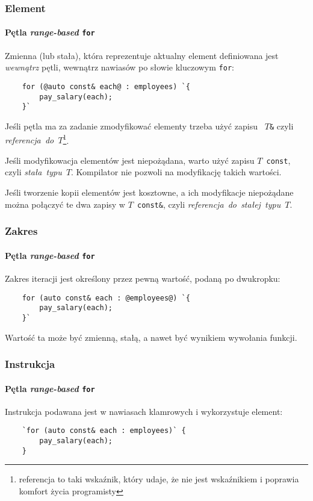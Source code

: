 \documentclass[aspectratio=169]{beamer}
\begin{document}
\begin{frame}[fragile]
    \frametitle{Element}
    \framesubtitle{Pętla \emph{range-based} {\tt for}}

    Zmienna (lub stała), która reprezentuje aktualny element definiowana jest
    \emph{wewnątrz} pętli, wewnątrz nawiasów po słowie kluczowym {\tt for}:

    \begin{lstlisting}
    for (@auto const& each@ : employees) `{
        pay_salary(each);
    }`
    \end{lstlisting}

    {\footnotesize
    Jeśli pętla ma za zadanie zmodyfikować elementy trzeba użyć zapisu {\tt
    $T$\&}
    czyli \emph{referencja~do~$T$}\footnote{referencja to taki wskaźnik, który
    udaje, że nie jest wskaźnikiem i poprawia komfort życia programisty}.

    Jeśli modyfikowacja elementów jest niepożądana, warto użyć zapisu
    {\tt $T$ const}, czyli \emph{stała~typu~$T$}. Kompilator nie pozwoli na
    modyfikację takich wartości.

    Jeśli tworzenie kopii elementów jest kosztowne, a ich modyfikacje
    niepożądane można połączyć te dwa zapisy w {\tt$T$ const\&}, czyli
    \emph{referencja~do~stałej~typu~$T$}.
    }
\end{frame}

\begin{frame}[fragile]
    \frametitle{Zakres}
    \framesubtitle{Pętla \emph{range-based} {\tt for}}

    Zakres iteracji jest określony przez pewną wartość, podaną po dwukropku:

    \begin{lstlisting}
    for (auto const& each : @employees@) `{
        pay_salary(each);
    }`
    \end{lstlisting}

    Wartość ta może być zmienną, stałą, a nawet być wynikiem wywołania funkcji.
\end{frame}

\begin{frame}[fragile]
    \frametitle{Instrukcja}
    \framesubtitle{Pętla \emph{range-based} {\tt for}}

    Instrukcja podawana jest w nawiasach klamrowych i wykorzystuje element:

    \begin{lstlisting}
    `for (auto const& each : employees)` {
        pay_salary(each);
    }
    \end{lstlisting}
\end{frame}
\end{document}
